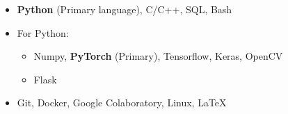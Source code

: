 \begin{itemize}
	\item \textbf{Python} (Primary language), C/C++, SQL, Bash%
	\item For Python:
	\begin{itemize}
		\item Numpy, \textbf{PyTorch} (Primary), Tensorflow, Keras, OpenCV
		\item Flask
	\end{itemize}    
	\item Git, Docker, Google Colaboratory, Linux, \LaTeX
\end{itemize}